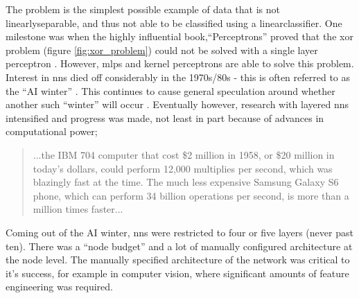 The  problem is the simplest possible example of data that is not \gls{linearlyseparable}, and thus not able to be classified using a \gls{linearclassifier}. One milestone was when the highly influential book,\enquote{Perceptrons} proved that the \gls{xor} problem (figure \ref{fig:xor_problem}) could not be solved with a single layer perceptron \cite[Chapter~4]{perceptron_book}. However, \gls{mlp}s and kernel perceptrons are able to solve this problem. Interest in \gls{nn}s died off considerably in the 1970s/80s - this is often referred to as the \enquote{AI winter} \cite{ai_winter}. This continues to cause general speculation around whether another such \enquote{winter} will occur \cite{ai_winter_spec}. Eventually however, research with layered \gls{nn}s intensified and progress was made, not least in part because of advances in computational power;  \bigskip


\begin{quote}
...the IBM 704 computer that cost \$2 million in 1958, or \$20 million in today’s dollars, could perform 12,000 multiplies per second, which was blazingly fast at the time. The much less expensive Samsung Galaxy S6 phone, which can perform 34 billion operations per second, is more than a million times faster...\cite{unreasonable_dl}
\end{quote}

\bigskip
Coming out of the AI winter, \gls{nn}s were restricted to four or five layers (never past ten). There was a \enquote{node budget} and a lot of manually configured architecture at the node level. The manually specified architecture of the network was critical to it's success, for example in computer vision, where significant amounts of feature engineering was required. 
\bigskip


